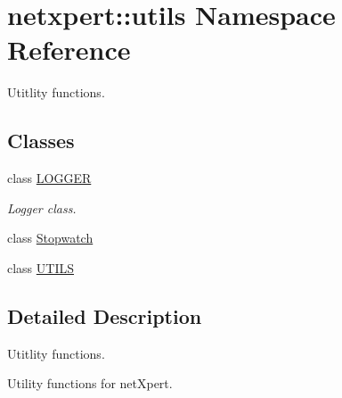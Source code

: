\hypertarget{namespacenetxpert_1_1utils}{}\section{netxpert\+:\+:utils Namespace Reference}
\label{namespacenetxpert_1_1utils}


Utitlity functions.  


\subsection*{Classes}
\begin{DoxyCompactItemize}
\item 
class \hyperlink{classnetxpert_1_1utils_1_1LOGGER}{L\+O\+G\+G\+ER}
\begin{DoxyCompactList}\small\item\em Logger class. \end{DoxyCompactList}\item 
class \hyperlink{classnetxpert_1_1utils_1_1Stopwatch}{Stopwatch}
\item 
class \hyperlink{classnetxpert_1_1utils_1_1UTILS}{U\+T\+I\+LS}
\end{DoxyCompactItemize}


\subsection{Detailed Description}
Utitlity functions. 

Utility functions for net\+Xpert. 